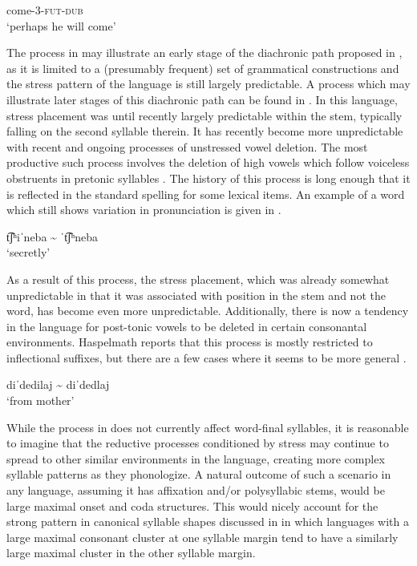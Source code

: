 come-3-\textsc{fut-dub}\\
\glt ‘perhaps he will come’
\citep[209]{Cole1982}
\z

  The process in  may illustrate an early stage of the diachronic path proposed in \citet{BybeeEtAl1998}, as it is limited to a (presumably frequent) set of grammatical constructions and the stress pattern of the language is still largely predictable. A process which may illustrate later stages of this diachronic path can be found in . In this language, stress placement was until recently largely predictable within the stem, typically falling on the second syllable therein. It has recently become more unpredictable with recent and ongoing processes of unstressed vowel deletion. The most productive such process involves the deletion of high vowels which follow voiceless obstruents in pretonic syllables \citep[36]{Haspelmath1993}. The history of this process is long enough that it is reflected in the standard spelling for some lexical items. An example of a word which still shows variation in pronunciation is given in .

\ea\label{ex:5.2}

t͡ʃʰiˈneba {\textasciitilde} ˈt͡ʃʰneba\\
\glt ‘secretly’
\citep[38]{Haspelmath1993}
\z

As a result of this process, the stress placement, which was already somewhat unpredictable in that it was associated with position in the stem and not the word, has become even more unpredictable. Additionally, there is now a tendency in the language for post-tonic vowels to be deleted in certain consonantal environments. Haspelmath reports that this process is mostly restricted to inflectional suffixes, but there are a few cases where it seems to be more general .

\ea\label{ex:5.3}

diˈdedilaj {\textasciitilde} diˈdedlaj\\
\glt ‘from mother’
\citep[40]{Haspelmath1993}
\z

  While the process in  does not currently affect word-final syllables, it is reasonable to imagine that the reductive processes conditioned by stress may continue to spread to other similar environments in the language, creating more complex syllable patterns as they phonologize. A natural outcome of such a scenario in any language, assuming it has affixation and/or polysyllabic stems, would be large maximal onset and coda structures. This would nicely account for the strong pattern in canonical syllable shapes discussed in  in which languages with a large maximal consonant cluster at one syllable margin tend to have a similarly large maximal cluster in the other syllable margin.

